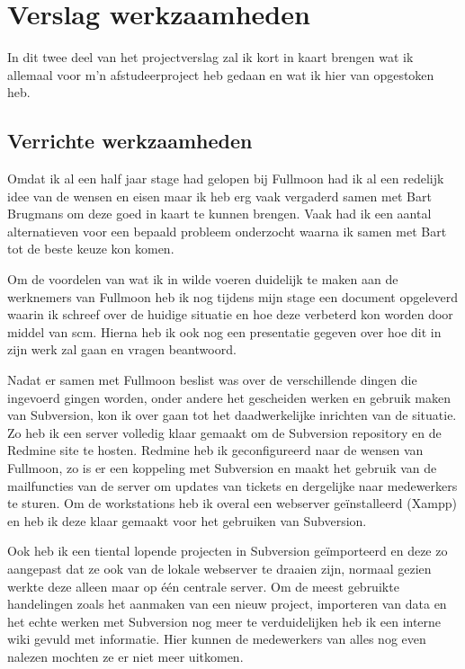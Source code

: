 \chapter{Verslag werkzaamheden}

In dit twee deel van het projectverslag zal ik kort in kaart brengen wat ik allemaal voor m'n afstudeerproject heb gedaan en wat ik hier van opgestoken heb.

\section{Verrichte werkzaamheden}

Omdat ik al een half jaar stage had gelopen bij Fullmoon had ik al een redelijk idee van de wensen en eisen maar ik heb erg vaak vergaderd samen met Bart Brugmans om deze goed in kaart te kunnen brengen. Vaak had ik een aantal alternatieven voor een bepaald probleem onderzocht waarna ik samen met Bart tot de beste keuze kon komen.

Om de voordelen van wat ik in wilde voeren duidelijk te maken aan de werknemers van Fullmoon heb ik nog tijdens mijn stage een document opgeleverd waarin ik schreef over de huidige situatie en hoe deze verbeterd kon worden door middel van {\sc scm}. Hierna heb ik ook nog een presentatie gegeven over hoe dit in zijn werk zal gaan en vragen beantwoord.

Nadat er samen met Fullmoon beslist was over de verschillende dingen die ingevoerd gingen worden, onder andere het gescheiden werken en gebruik maken van Subversion, kon ik over gaan tot het daadwerkelijke inrichten van de situatie. Zo heb ik een server volledig klaar gemaakt om de Subversion repository en de Redmine site te hosten. Redmine heb ik geconfigureerd naar de wensen van Fullmoon, zo is er een koppeling met Subversion en maakt het gebruik van de mailfuncties van de server om updates van tickets en dergelijke naar medewerkers te sturen. Om de workstations heb ik overal een webserver geïnstalleerd (Xampp) en heb ik deze klaar gemaakt voor het gebruiken van Subversion.

Ook heb ik een tiental lopende projecten in Subversion geïmporteerd en deze zo aangepast dat ze ook van de lokale webserver te draaien zijn, normaal gezien werkte deze alleen maar op één centrale server. Om de meest gebruikte handelingen zoals het aanmaken van een nieuw project, importeren van data en het echte werken met Subversion nog meer te verduidelijken heb ik een interne wiki gevuld met informatie. Hier kunnen de medewerkers van alles nog even nalezen mochten ze er niet meer uitkomen.

